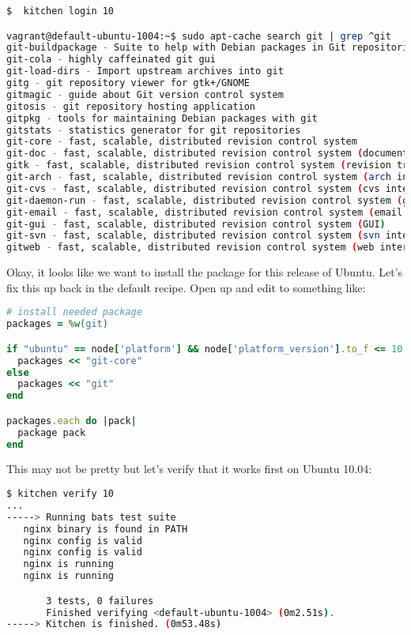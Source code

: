 \begin{lstlisting}[language=Bash,label=lst:testing-test-kitchen29]
$  kitchen login 10

vagrant@default-ubuntu-1004:~$ sudo apt-cache search git | grep ^git
git-buildpackage - Suite to help with Debian packages in Git repositories
git-cola - highly caffeinated git gui
git-load-dirs - Import upstream archives into git
gitg - git repository viewer for gtk+/GNOME
gitmagic - guide about Git version control system
gitosis - git repository hosting application
gitpkg - tools for maintaining Debian packages with git
gitstats - statistics generator for git repositories
git-core - fast, scalable, distributed revision control system
git-doc - fast, scalable, distributed revision control system (documentation)
gitk - fast, scalable, distributed revision control system (revision tree visualizer)
git-arch - fast, scalable, distributed revision control system (arch interoperability)
git-cvs - fast, scalable, distributed revision control system (cvs interoperability)
git-daemon-run - fast, scalable, distributed revision control system (git-daemon service)
git-email - fast, scalable, distributed revision control system (email add-on)
git-gui - fast, scalable, distributed revision control system (GUI)
git-svn - fast, scalable, distributed revision control system (svn interoperability)
gitweb - fast, scalable, distributed revision control system (web interface)
\end{lstlisting}

Okay, it looks like we want to install the  package for this release of Ubuntu. Let's fix this up back in the default recipe. Open up  and edit to something like:

\begin{lstlisting}[language=Ruby,label=lst:testing-test-kitchen30]
# install needed package
packages = %w(git)

if "ubuntu" == node['platform'] && node['platform_version'].to_f <= 10.04
  packages << "git-core"
else
  packages << "git"
end

packages.each do |pack|
  package pack
end
\end{lstlisting}

This may not be pretty but let's verify that it works first on Ubuntu 10.04:

\begin{lstlisting}[language=Bash,label=lst:testing-test-kitchen31]
$ kitchen verify 10
...
-----> Running bats test suite
   nginx binary is found in PATH
   nginx config is valid                                                    2/3
   nginx config is valid
   nginx is running                                                         3/3
   nginx is running

       3 tests, 0 failures
       Finished verifying <default-ubuntu-1004> (0m2.51s).
-----> Kitchen is finished. (0m53.48s)
\end{lstlisting}

